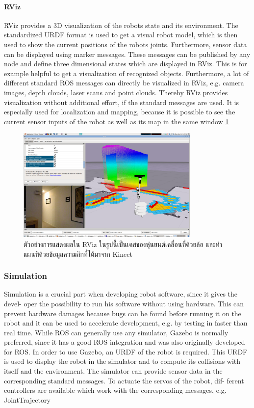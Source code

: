\paragraph*{RViz}
RViz  provides  a  3D  visualization  of  the  robots  state  and  its  environment.   The
standardized URDF format is used to get a visual robot model, which is then used
to  show  the  current  positions  of  the  robots  joints.   Furthermore,  sensor  data  can
be displayed using marker messages.  These messages can be published by any node
and define three dimensional states which are displayed in RViz.  This is for example
helpful to get a visualization of recognized objects.  Furthermore, a lot of different
standard  ROS  messages  can  directly  be  visualized  in  RViz,  e.g.   camera  images,
depth  clouds,  laser  scans  and  point  clouds.   Thereby  RViz  provides  visualization
without additional effort, if the standard messages are used.  It is especially used for
localization and mapping, because it is possible to see the current sensor inputs of
the robot as well as its map in the same window \ref{fig:example_visualization_rviz}

\begin{figure}[htbp]
    \centering
    \includegraphics[width=0.8\textwidth]{chapter2/images/nav_test_rviz_2.png}
	\caption{ตัวอย่างการแสดงผลใน RViz ในรูปนี้เป็นเคสของหุ่นยนต์เคลื่อนที่ด้วยล้อ และทำแผนที่ด้วยข้อมูลความลึกที่ได้มาจาก Kinect}
    \label{fig:example_visualization_rviz}
\end{figure}



\subsubsection*{Simulation}
Simulation is a crucial part when developing robot software, since it gives the devel-
oper the possibility to run his software without using hardware.  This can prevent
hardware damages because bugs can be found before running it on the robot and
it can be used to accelerate development, e.g.  by testing in faster than real time.
While ROS can generally use any simulator, Gazebo is normally preferred, since it
has a good ROS integration and was also originally developed for ROS. In order to
use Gazebo, an URDF of the robot is required.
This  URDF  is  used  to  display  the  robot  in  the  simulator  and  to  compute  its
collisions with itself and the environment.  The simulator can provide sensor data
in  the  corresponding  standard  messages.   To  actuate  the  servos  of  the  robot,  dif-
ferent  controllers  are  available  which  work  with  the  corresponding  messages,  e.g.
JointTrajectory
